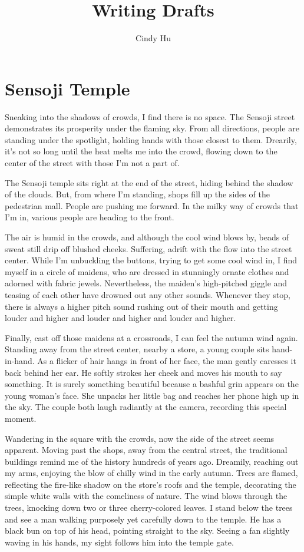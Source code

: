 \documentclass[11pt, oneside]{article}   	%
\title{Writing Drafts}
\author{Cindy Hu}
\begin{document}
\maketitle




\section{Sensoji Temple}

Sneaking into the shadows of crowds, I find there is no space. The Sensoji street demonstrates its prosperity under the flaming sky. From all directions, people are standing under the spotlight, holding hands with those closest to them. Drearily, it’s not so long until the heat melts me into the crowd, flowing down to the center of the street with those I’m not a part of. 

The Sensoji temple sits right at the end of the street, hiding behind the shadow of the clouds. But, from where I’m standing, shops fill up the sides of the pedestrian mall. People are pushing me forward. In the milky way of crowds that I’m in, various people are heading to the front.  

The air is humid in the crowds, and although the cool wind blows by, beads of sweat still drip off blushed cheeks. Suffering, adrift with the flow into the street center. While I’m unbuckling the buttons, trying to get some cool wind in, I find myself in a circle of maidens, who are dressed in stunningly ornate clothes and adorned with fabric jewels. Nevertheless, the maiden’s high-pitched giggle and teasing of each other have drowned out any other sounds. Whenever they stop, there is always a higher pitch sound rushing out of their mouth and getting louder and higher and louder and higher and louder and higher.  
  
Finally, cast off those maidens at a crossroads, I can feel the autumn wind again. Standing away from the street center, nearby a store, a young couple sits hand-in-hand. As a flicker of hair hangs in front of her face, the man gently caresses it back behind her ear. He softly strokes her cheek and moves his mouth to say something. It is surely something beautiful because a bashful grin appears on the young woman’s face. She unpacks her little bag and reaches her phone high up in the sky. The couple both laugh radiantly at the camera, recording this special moment. 

Wandering in the square with the crowds, now the side of the street seems apparent. Moving past the shops, away from the central street, the traditional buildings remind me of the history hundreds of years ago. Dreamily, reaching out my arms, enjoying the blow of chilly wind in the early autumn. Trees are flamed, reflecting the fire-like shadow on the store’s roofs and the temple, decorating the simple white walls with the comeliness of nature. The wind blows through the trees, knocking down two or three cherry-colored leaves. I stand below the trees and see a man walking purposely yet carefully down to the temple. He has a black bun on top of his head, pointing straight to the sky. Seeing a fan slightly waving in his hands, my sight follows him into the temple gate.   
\end{document}
